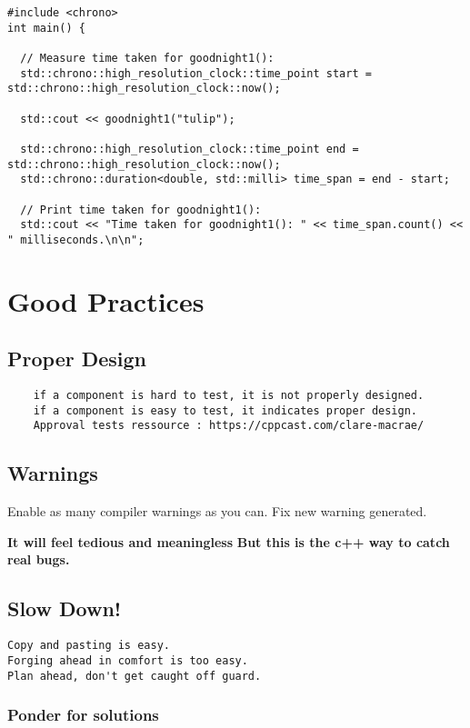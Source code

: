 \documentclass[openany]{report}
\begin{document}
\begin{verbatim}
#include <chrono>
int main() {

  // Measure time taken for goodnight1():
  std::chrono::high_resolution_clock::time_point start = std::chrono::high_resolution_clock::now();

  std::cout << goodnight1("tulip");

  std::chrono::high_resolution_clock::time_point end = std::chrono::high_resolution_clock::now();
  std::chrono::duration<double, std::milli> time_span = end - start;

  // Print time taken for goodnight1():
  std::cout << "Time taken for goodnight1(): " << time_span.count() << " milliseconds.\n\n";
\end{verbatim}

\chapter{Good Practices}

\section{Proper Design}

\begin{verbatim}
    if a component is hard to test, it is not properly designed. 
    if a component is easy to test, it indicates proper design. 
    Approval tests ressource : https://cppcast.com/clare-macrae/ 
\end{verbatim}

\section{Warnings}

Enable as many compiler warnings as you can. 
Fix new warning generated. 

\textbf{It will feel tedious and meaningless}
\textbf{But this is the c++ way to catch real bugs.}

\section{Slow Down!}

\begin{verbatim}
Copy and pasting is easy. 
Forging ahead in comfort is too easy.
Plan ahead, don't get caught off guard. 
\end{verbatim}

\subsection{Ponder for solutions}
\end{document}
